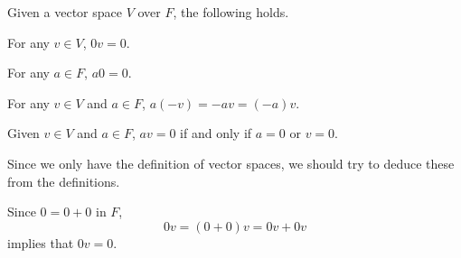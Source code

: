 \begin{observation}
    \label{obv:zerovector}
    Given a vector space \(V\) over \(F\),
    the following holds.
    \begin{nlist}
        \item For any \(v\in V\),
        \(0v=0\).
        \item For any \(a\in F\),
        \(a0=0\).
        \item For any \(v\in V\) and \(a\in F\),
        \(a(-v)=-av=(-a)v\).
        \item Given \(v\in V\) and \(a\in F\),
        \(av=0\) if and only if \(a=0\) or \(v=0\).
    \end{nlist}
\end{observation}
\begin{sketch}
    Since we only have the definition of vector spaces,
    we should try to deduce these from the definitions.
\end{sketch}
\begin{myproof}
    \begin{nlist}
        \item Since \(0=0+0\) in \(F\),
        \[
            0v=(0+0)v=0v+0v
        \]
        implies that \(0v=0\).
    \end{nlist}
\end{myproof}